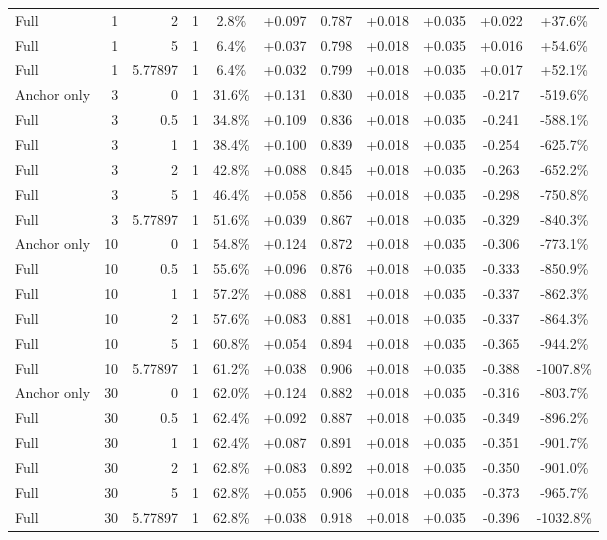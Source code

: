 \begin{table}[htbp]
\begin{tabular}{lrrrccccccc}
Full & 1 & 2 & 1 & 2.8\% & +0.097 & 0.787 & +0.018 & +0.035 & +0.022 & +37.6\% \\
Full & 1 & 5 & 1 & 6.4\% & +0.037 & 0.798 & +0.018 & +0.035 & +0.016 & +54.6\% \\
Full & 1 & 5.77897 & 1 & 6.4\% & +0.032 & 0.799 & +0.018 & +0.035 & +0.017 & +52.1\% \\
Anchor only & 3 & 0 & 1 & 31.6\% & +0.131 & 0.830 & +0.018 & +0.035 & -0.217 & -519.6\% \\
Full & 3 & 0.5 & 1 & 34.8\% & +0.109 & 0.836 & +0.018 & +0.035 & -0.241 & -588.1\% \\
Full & 3 & 1 & 1 & 38.4\% & +0.100 & 0.839 & +0.018 & +0.035 & -0.254 & -625.7\% \\
Full & 3 & 2 & 1 & 42.8\% & +0.088 & 0.845 & +0.018 & +0.035 & -0.263 & -652.2\% \\
Full & 3 & 5 & 1 & 46.4\% & +0.058 & 0.856 & +0.018 & +0.035 & -0.298 & -750.8\% \\
Full & 3 & 5.77897 & 1 & 51.6\% & +0.039 & 0.867 & +0.018 & +0.035 & -0.329 & -840.3\% \\
Anchor only & 10 & 0 & 1 & 54.8\% & +0.124 & 0.872 & +0.018 & +0.035 & -0.306 & -773.1\% \\
Full & 10 & 0.5 & 1 & 55.6\% & +0.096 & 0.876 & +0.018 & +0.035 & -0.333 & -850.9\% \\
Full & 10 & 1 & 1 & 57.2\% & +0.088 & 0.881 & +0.018 & +0.035 & -0.337 & -862.3\% \\
Full & 10 & 2 & 1 & 57.6\% & +0.083 & 0.881 & +0.018 & +0.035 & -0.337 & -864.3\% \\
Full & 10 & 5 & 1 & 60.8\% & +0.054 & 0.894 & +0.018 & +0.035 & -0.365 & -944.2\% \\
Full & 10 & 5.77897 & 1 & 61.2\% & +0.038 & 0.906 & +0.018 & +0.035 & -0.388 & -1007.8\% \\
Anchor only & 30 & 0 & 1 & 62.0\% & +0.124 & 0.882 & +0.018 & +0.035 & -0.316 & -803.7\% \\
Full & 30 & 0.5 & 1 & 62.4\% & +0.092 & 0.887 & +0.018 & +0.035 & -0.349 & -896.2\% \\
Full & 30 & 1 & 1 & 62.4\% & +0.087 & 0.891 & +0.018 & +0.035 & -0.351 & -901.7\% \\
Full & 30 & 2 & 1 & 62.8\% & +0.083 & 0.892 & +0.018 & +0.035 & -0.350 & -901.0\% \\
Full & 30 & 5 & 1 & 62.8\% & +0.055 & 0.906 & +0.018 & +0.035 & -0.373 & -965.7\% \\
Full & 30 & 5.77897 & 1 & 62.8\% & +0.038 & 0.918 & +0.018 & +0.035 & -0.396 & -1032.8\% \\

\end{tabular}
\end{table}
